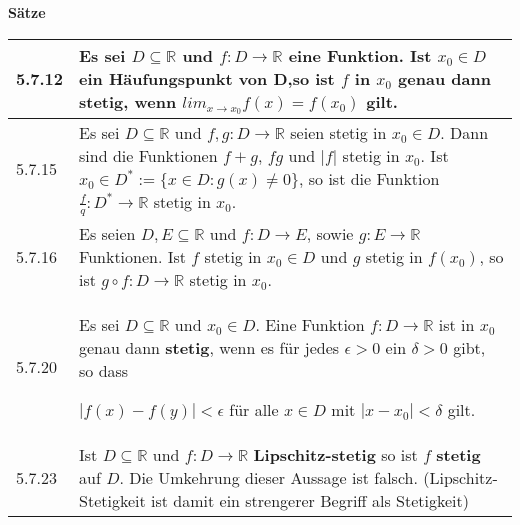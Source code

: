     \noindent 
    \textbf{Sätze}
    \begin{table}[H]
    \begin{tabularx}{\textwidth}{X m{16cm}}
        \toprule

        5.7.12& Es sei $D \subseteq \mathbb{R}$ und $f : D \rightarrow \mathbb{R}$ eine Funktion. Ist $x_0 \in D$ ein Häufungspunkt
                von D,so ist $f$ in $x_0$ genau dann \textbf{stetig}, wenn $lim_{x \rightarrow x_0} f(x) = f(x_0)$ gilt. \\
        \midrule
        5.7.15& Es sei $D \subseteq \mathbb{R}$ und $f,g : D \rightarrow \mathbb{R}$ seien stetig in $x_0 \in D$. Dann sind die
                Funktionen $f+g$, $fg$ und $|f|$ stetig in $x_0$. \hfill \break
                Ist $x_0 \in D^* := \{ x \in D: g(x) \neq 0\}$, so ist die Funktion $\frac{f}{q}:D^* \rightarrow \mathbb{R}$ stetig in $x_0$.\\
        \midrule
        5.7.16& Es seien $D,E \subseteq \mathbb{R}$ und $f: D \rightarrow E$, sowie $g: E \rightarrow \mathbb{R}$ Funktionen. Ist $f$ 
                stetig in $x_0 \in D$ und $g$ stetig in $f(x_0)$, so ist $g \circ f: D \rightarrow \mathbb{R}$ stetig in $x_0$. \\ 
        \midrule
        5.7.20& Es sei $D \subseteq \mathbb{R}$ und $x_0 \in D$. Eine Funktion $f: D \rightarrow \mathbb{R}$ ist in $x_0$ genau dann
                \textbf{stetig}, wenn es für jedes $\epsilon > 0$ ein $\delta > 0$ gibt, so dass \hfill \break
                \centerline{$|f(x) - f(y)| < \epsilon$ für alle $x \in D$ mit $|x-x_0|<\delta$ gilt.} \\
        \midrule
        5.7.23& Ist $D \subseteq \mathbb{R}$ und $f:D \rightarrow \mathbb{R}$ \textbf{Lipschitz-stetig} so ist $f$ \textbf{stetig} auf $D$.
                Die Umkehrung dieser Aussage ist falsch. (Lipschitz-Stetigkeit ist damit ein strengerer Begriff als Stetigkeit) \\
        \bottomrule
    \end{tabularx}
    \end{table}

    \pagebreak

